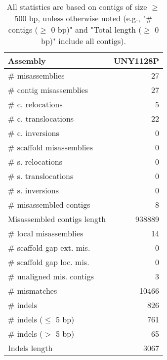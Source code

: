 \documentclass[12pt,a4paper]{article}
\begin{document}
\begin{table}[ht]
\begin{center}
\caption{All statistics are based on contigs of size $\geq$ 500 bp, unless otherwise noted (e.g., "\# contigs ($\geq$ 0 bp)" and "Total length ($\geq$ 0 bp)" include all contigs).}
\begin{tabular}{|l*{1}{|r}|}
\hline
Assembly & UNY1128P \\ \hline
\# misassemblies & 27 \\ \hline
\hspace{2mm}\# contig misassemblies & 27 \\ \hline
\hspace{5mm}\# c. relocations & 5 \\ \hline
\hspace{5mm}\# c. translocations & 22 \\ \hline
\hspace{5mm}\# c. inversions & 0 \\ \hline
\hspace{2mm}\# scaffold misassemblies & 0 \\ \hline
\hspace{5mm}\# s. relocations & 0 \\ \hline
\hspace{5mm}\# s. translocations & 0 \\ \hline
\hspace{5mm}\# s. inversions & 0 \\ \hline
\# misassembled contigs & 8 \\ \hline
Misassembled contigs length & 938889 \\ \hline
\# local misassemblies & 14 \\ \hline
\# scaffold gap ext. mis. & 0 \\ \hline
\# scaffold gap loc. mis. & 0 \\ \hline
\# unaligned mis. contigs & 3 \\ \hline
\# mismatches & 10466 \\ \hline
\# indels & 826 \\ \hline
\hspace{5mm}\# indels ($\leq$ 5 bp) & 761 \\ \hline
\hspace{5mm}\# indels ($>$ 5 bp) & 65 \\ \hline
Indels length & 3067 \\ \hline
\end{tabular}
\end{center}
\end{table}
\end{document}
